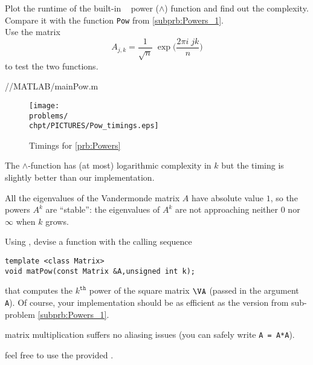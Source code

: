 \begin{problem}[Matrix powers]

\begin{subproblem}[1] \label{subprb:Powers_3}
Plot the runtime of the built-in \Matlab~ power ($\wedge$) function and find out the complexity.
Compare it with the function \texttt{Pow} from \ref{subprb:Powers_1}.\\
Use the matrix
$$A_{j,k}= \frac1{\sqrt n} \;\exp\Big(\frac{2\pi i \;jk}n\Big)$$
to test the two functions.

\begin{solution}

{\problems/\chpt/MATLAB/mainPow.m}

\begin{figure}[htb]
\centering
\label{fig:Pow_timings}
\texttt{[image: \\problems/\\chpt/PICTURES/Pow\_timings.eps]}
\caption{Timings for \ref{prb:Powers}}
\end{figure}

The \Matlab $\wedge$-function has (at most) logarithmic complexity in $k$ but the timing is slightly better than our implementation. %

All the eigenvalues of the Vandermonde matrix $A$ have absolute value $1$, so the powers $A^k$ are ``stable'':
the eigenvalues of $A^k$ are not approaching neither $0$ nor $\infty$ when $k$ grows.
\end{solution}
\end{subproblem}

\begin{subproblem}[2] \label{sp:pow:o1}
  Using \eigen{}, devise a \Cpp{} function with the calling sequence
\begin{lstlisting}
template <class Matrix>
void matPow(const Matrix &A,unsigned int k);
\end{lstlisting}
that computes the $k^{\mathtt{th}}$ power of the square matrix $\VA$ (passed in
the argument \texttt{A}). Of course, your implementation should be as efficient
as the \matlab{} version from sub-problem \ref{subprb:Powers_1}.

\begin{hint}
 matrix multiplication suffers no aliasing issues (you can safely write \texttt{A = A*A}).
\end{hint}

\begin{hint}
 feel free to use the provided .
\end{hint}


\end{subproblem}
\end{problem}

